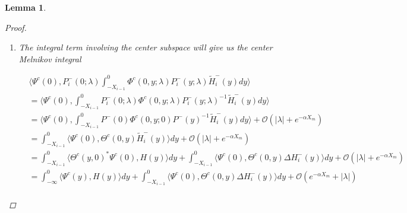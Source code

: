 \documentclass[12pt]{article}
\newtheorem{lemma}{Lemma}
\begin{document}
\begin{lemma}
\begin{proof}
\begin{enumerate}
\begin{align*}
|(P_i^+(0; \lambda) &- P^+(0))P_0^c(0) e^{-\nu(\lambda)X_i} c_i^+ + P_i^+(0; \lambda) (P_0^c(\lambda) - P_0^c(0)) e^{-\nu(\lambda)X_i} c_i^+| \\
&\leq C (|\lambda| + e^{-\alpha X_m}) |e^{-\nu(\lambda)X_i} c_i^+| \\
&\leq C (|\lambda| + e^{-\alpha X_m}) \Big( |e^{-\nu(\lambda)X_i} c_i^-| + e^{-\tilde{\alpha}X_m} (|\lambda| + e^{-\tilde{\alpha}X_m})( |\tilde{c}_{i-1}^+| + |\tilde{c}_{i+1}^-|) \\
&+ e^{-(\alpha - 2 \rho) X_i}|c_i^-| +  e^{-\tilde{\alpha}X_m}(|\lambda| + |D_i|)|d| \Big) \\
&\leq C (|\lambda| + e^{-\alpha X_m}) \Big( |\tilde{c}_i^-| + e^{-\tilde{\alpha}X_m} (|\lambda| + e^{-\tilde{\alpha}X_m})( |\tilde{c}_{i-1}^+| + |\tilde{c}_{i+1}^-|) +  e^{-\tilde{\alpha}X_m}(|\lambda| + |D_i|)|d| \Big)
\end{align*}

Combining all of these, the terms involving $c_i$ are given by

\begin{align*}
e^{\nu(\lambda) X_{i-1} } &c_{i-1}^- - e^{-\nu(\lambda)X_i} c_i^- + \mathcal{O}\Big( (|\lambda| + e^{-\alpha X_m})(|\tilde{c}_{i-1}^+| + |\tilde{c}_i^-|) + e^{-\tilde{\alpha}X_m} (|\lambda| + e^{-\tilde{\alpha}X_m})|\tilde{c}_{i+1}^-| \\
&+ e^{-\tilde{\alpha}X_m}(|\lambda| + |D_i|)|d| \Big)  
\end{align*}

\item The integral term involving the center subspace will give us the center Melnikov integral

\begin{align*}
&\langle \Psi^c(0), P_i^-(0; \lambda) \int_{-X_{i-1}}^0 \Phi^c(0, y; \lambda) P_i^-(y; \lambda) \tilde{H}_i^-(y) dy \rangle \\
&= \langle \Psi^c(0), \int_{-X_{i-1}}^0 P_i^-(0; \lambda) \Phi^c(0, y; \lambda) P_i^-(y; \lambda)^{-1} \tilde{H}_i^-(y) dy \rangle \\
&= \langle \Psi^c(0), \int_{-X_{i-1}}^0 P^-(0) \Phi^c(0, y; 0) P^-(y)^{-1} \tilde{H}_i^-(y) dy \rangle + \mathcal{O}(|\lambda| + e^{-\alpha X_m}) \\
&= \int_{-X_{i-1}}^0 \langle \Psi^c(0), \Theta^c(0, y) \tilde{H}_i^-(y) \rangle dy + \mathcal{O}(|\lambda| + e^{-\alpha X_m}) \\
&= \int_{-X_{i-1}}^0 \langle \Theta^c(y, 0)^* \Psi^c(0), H(y) \rangle dy + \int_{-X_{i-1}}^0 \langle \Psi^c(0), \Theta^c(0, y) \Delta H_i^-(y) \rangle dy + \mathcal{O}(|\lambda| + e^{-\alpha X_m}) \\
&= \int_{-\infty}^0 \langle \Psi^c(y), H(y) \rangle dy + \int_{-X_{i-1}}^0 \langle \Psi^c(0), \Theta^c(0, y) \Delta H_i^-(y) \rangle dy + \mathcal{O}(e^{-\alpha X_m} + |\lambda|) \\
\end{align*}


\end{enumerate}
\end{proof}
\end{lemma}
\end{document}
